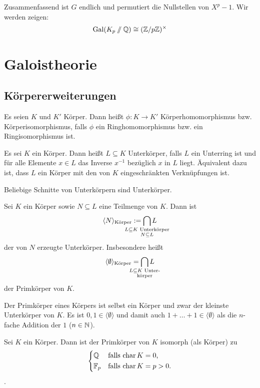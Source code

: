 \documentclass[12pt,a4paper]{scrartcl}
\begin{document}
Zusammenfassend ist $G$ endlich und permutiert die Nullstellen von $X^p-1$. Wir werden zeigen:
\[
\operatorname{Gal}(K_p \sslash \mathbb Q) \cong (\mathbb Z/p\mathbb Z)^\times
\]

\section{Galoistheorie}
\subsection{Körpererweiterungen}
\begin{defi}
	Es seien $K$ und $K'$ Körper. Dann heißt $\phi : K \to K'$ Körperhomomorphismus bzw. Körperisomorphismus, falls $\phi$ ein Ringhomomorphismus bzw. ein Ringisomorphismus ist.
\end{defi}

\begin{defi}
	Es sei $K$ ein Körper. Dann heißt $L \subseteq K$ Unterkörper, falls $L$ ein Unterring ist und für alle Elemente $x \in L$ das Inverse $x^{-1}$ bezüglich $x$ in $L$ liegt. Äquivalent dazu ist, dass $L$ ein Körper mit den von $K$ eingeschränkten Verknüpfungen ist.
\end{defi}

\begin{bem}
	Beliebige Schnitte von Unterkörpern sind Unterkörper.
\end{bem}

\begin{defi}
	Sei $K$ ein Körper sowie $N\subseteq L$ eine Teilmenge von $K$. Dann ist
	\[
	\langle N\rangle_\text{Körper} := \bigcap_{\mathclap{\substack{L \subseteq K\text{ Unterkörper}\\N\subseteq L}}} L
	\]
	der von $N$ erzeugte Unterkörper. Insbesondere heißt
	\[
	\langle \emptyset\rangle_\text{Körper} = \bigcap_{\mathclap{\substack{L \subseteq K\text{ Unter-}\\\text{körper}}}} L
	\]
	der Primkörper von $K$.
\end{defi}


\begin{bem}
	Der Primkörper eines Körpers ist selbst ein Körper und zwar der kleinste Unterkörper von $K$. Es ist $0,1\in \langle\emptyset\rangle$ und damit auch $1+\dots+1 \in \langle \emptyset\rangle$ als die $n$-fache Addition der $1$ ($n\in\mathbb N$).
\end{bem}

\begin{satz} Sei $K$ ein Körper. Dann ist der Primkörper von $K$ isomorph (als Körper) zu \[\begin{cases*} \IQ& falls $\chr K =0$,\\
	\IF_p& falls $\chr K = p > 0$.\end{cases*}\].
\end{satz}
\end{document}
